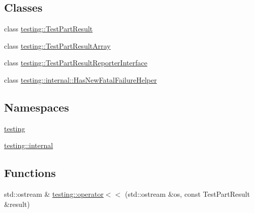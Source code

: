 \subsection*{Classes}
\begin{DoxyCompactItemize}
\item 
class \hyperlink{classtesting_1_1TestPartResult}{testing\+::\+Test\+Part\+Result}
\item 
class \hyperlink{classtesting_1_1TestPartResultArray}{testing\+::\+Test\+Part\+Result\+Array}
\item 
class \hyperlink{classtesting_1_1TestPartResultReporterInterface}{testing\+::\+Test\+Part\+Result\+Reporter\+Interface}
\item 
class \hyperlink{classtesting_1_1internal_1_1HasNewFatalFailureHelper}{testing\+::internal\+::\+Has\+New\+Fatal\+Failure\+Helper}
\end{DoxyCompactItemize}
\subsection*{Namespaces}
\begin{DoxyCompactItemize}
\item 
 \hyperlink{namespacetesting}{testing}
\item 
 \hyperlink{namespacetesting_1_1internal}{testing\+::internal}
\end{DoxyCompactItemize}
\subsection*{Functions}
\begin{DoxyCompactItemize}
\item 
std\+::ostream \& \hyperlink{namespacetesting_a7c88897836b9f492190fb2b9dfa3a327}{testing\+::operator$<$$<$} (std\+::ostream \&os, const Test\+Part\+Result \&result)
\end{DoxyCompactItemize}
